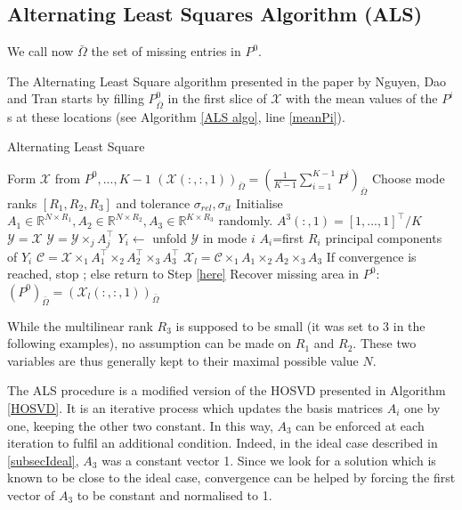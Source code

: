 \documentclass[a4paper, 11pt]{article} %
\def \X {\mathcal{X}}
\def \R {\mathbb{R}}
\def \t {\times}
\def \Y {\mathcal{Y}}
\def \C {\mathcal{C}}
\def \Xl {\mathcal{X}_{l}}
\def \bO{\bar{\Omega}}
\begin{document}
\subsection{Alternating Least Squares Algorithm (ALS)}
We call now $\bar{\Omega}$ the set of missing entries in $P^0$.

The Alternating Least Square algorithm presented in the paper by Nguyen, Dao and Tran \cite{ALS} starts by filling $P^0_{\bO}$ in the first slice of $\X$ with the mean values of the $P^i$s at these locations (see Algorithm \ref{ALS algo}, line \ref{meanPi}).

\begin{algorithm}
\caption{Alternating Least Square}\label{ALS algo}
\begin{algorithmic}[1]
\State Form $\X$ from $P^0,...,K-1$ 
\State $(\X(:,:,1))_{\bO}=(\frac{1}{K-1}\sum_{i=1}^{K-1}P^i)_{\bO}$ \label{meanPi}
\State Choose mode ranks $[R_1, R_2, R_3]$ and tolerance $\sigma_{rel}, \sigma_{it}$
\State Initialise $A_1 \in \R^{N\t R_1}, A_2\in \R^{N\t R_2}, A_3\in \R^{K\t R_3}$ randomly.
\State $A^3(:,1)=[1,...,1]^{\top}/K$ \label{here}
\State $\Y=\X$
	\State $\Y=\Y\t_j A_j^\top$
\EndFor
\State$Y_i\gets$  unfold $\Y$ in mode $i$
\State $A_i$=first $R_i$ principal components of $Y_i$
\EndFor
\State $\C=\X\t_1 A_1^{\top}\t_2 A_2^{\top}\t_3 A_3^{\top}$
\State $\X_l=\C\t_1 A_1 \t_2 A_2 \t_3 A_3$
\State If convergence is reached, stop ; else return to Step \ref{here}
\State Recover missing area in $P^0$: $(P^0)_{\bO}=(\Xl(:,:,1))_{\bO}$
\end{algorithmic}
\end{algorithm}

While the multilinear rank $R_3$ is supposed to be small (it was set to 3 in the following examples), no assumption can be made on $R_1$ and $R_2$. These two variables are thus generally kept to their maximal possible value $N$.

The ALS procedure is a modified version of the HOSVD presented in Algorithm \autoref{HOSVD}. It is an iterative process which updates the basis matrices $A_i$ one by one, keeping the other two constant. In this way, $A_3$ can be enforced at each iteration to fulfil an additional condition.
Indeed, in the ideal case described in \autoref{subsecIdeal}, $A_3$ was a constant vector 1. Since we look for a solution which is known to be close to the ideal case, convergence can be helped by forcing the first vector of $A_3$ to be constant and normalised to 1.
\end{document}
